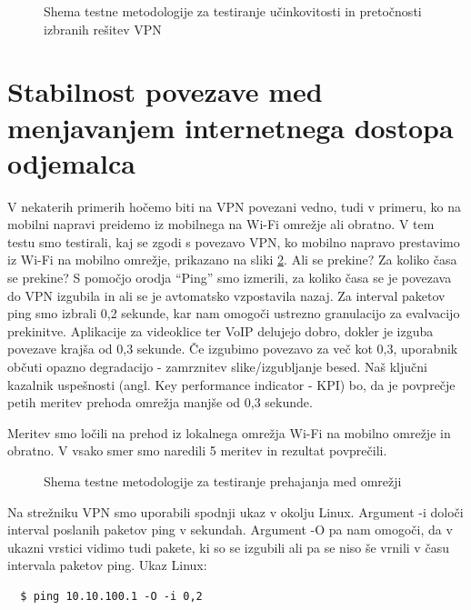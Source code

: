 \documentclass[a4paper, 12pt]{book}
\begin{document}
\begin{figure}[h]
\begin{center}

\end{center}
\caption{Shema testne metodologije za testiranje učinkovitosti in pretočnosti izbranih rešitev VPN \cite{rvidmar}}
\label{throughput}
\end{figure}


\section{Stabilnost povezave med menjavanjem internetnega dostopa odjemalca}
\label{test_stabilnost}
V nekaterih primerih hočemo biti na VPN povezani vedno, tudi v primeru, ko na mobilni napravi preidemo iz mobilnega na Wi-Fi omrežje ali obratno. V tem testu smo testirali, kaj se zgodi s povezavo VPN, ko mobilno napravo prestavimo iz Wi-Fi na mobilno omrežje, prikazano na sliki \ref{roaming}. Ali se prekine? Za koliko časa se prekine? S pomočjo orodja “Ping” smo izmerili, za koliko časa se je povezava do VPN izgubila in ali se je avtomatsko vzpostavila nazaj. Za interval paketov ping smo izbrali 0,2 sekunde, kar nam omogoči ustrezno granulacijo za evalvacijo prekinitve. Aplikacije za videoklice ter VoIP delujejo dobro, dokler je izguba povezave krajša od 0,3 sekunde. Če izgubimo povezavo za več kot 0,3, uporabnik občuti opazno degradacijo - zamrznitev slike/izgubljanje besed. Naš ključni kazalnik uspešnosti (angl. Key performance indicator - KPI) bo, da je povprečje petih meritev prehoda omrežja manjše od 0,3 sekunde.

Meritev smo ločili na prehod iz lokalnega omrežja Wi-Fi na mobilno omrežje in obratno. V vsako smer smo naredili 5 meritev in rezultat povprečili.

\begin{figure}[h!]
\begin{center}

\end{center}
\caption{Shema testne metodologije za testiranje prehajanja med omrežji \cite{rvidmar}}
\label{roaming}
\end{figure}

Na strežniku VPN smo uporabili spodnji ukaz v okolju Linux. Argument -i določi interval poslanih paketov ping v sekundah. Argument -O pa nam omogoči, da v ukazni vrstici vidimo tudi pakete, ki so se izgubili ali pa se niso še vrnili v času intervala paketov ping. Ukaz Linux:
\begin{verbatim}
  $ ping 10.10.100.1 -O -i 0,2
\end{verbatim}
\end{document}
